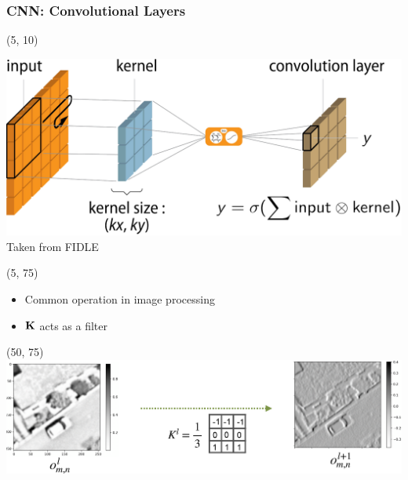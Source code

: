 \begin{frame}[label=Convolutional_Layers]
  \frametitle{\acl{CNN}: Convolutional Layers}

  \begin{textblock}{90}(5, 10)
    \begin{center}
      \includegraphics[width=\textwidth]{img/Convolution.png}
      Taken from FIDLE
    \end{center}
  \end{textblock}

  \begin{textblock}{46}(5, 75)
    \begin{itemize}
    \item Common operation in image processing
    \item $\mathbf{K}$ acts as a filter
    \end{itemize}
  \end{textblock}

  \begin{textblock}{45}(50, 75)
    \includegraphics[width=\textwidth]{img/CNN_Filter.png}
  \end{textblock}
\end{frame}


